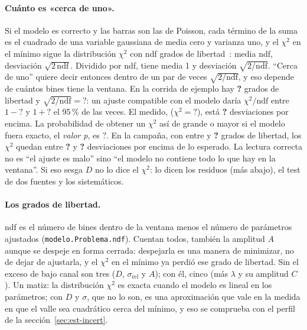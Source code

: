 \documentclass[11pt,a4paper]{article}
\newcommand{\faltaMacro}{\textbf{?}}
\providecommand{\EjNdf}{\faltaMacro}\providecommand{\EjChiDos}{\faltaMacro}
\providecommand{\EjSigmaNdf}{\faltaMacro}\providecommand{\EjDosSigmaNdf}{\faltaMacro}
\providecommand{\EjChiSigmas}{\faltaMacro}\providecommand{\EjChiPvalor}{\faltaMacro}
\providecommand{\NdfMax}{\faltaMacro}\providecommand{\ChiSigmasMin}{\faltaMacro}
\providecommand{\ChiSigmasMax}{\faltaMacro}
\begin{document}
\paragraph{Cuánto es «cerca de uno».} Si el modelo es correcto y las barras
son las de Poisson, cada término de la suma es el cuadrado de una variable
gaussiana de media cero y varianza uno, y el $\chi^2$ en el mínimo sigue la
distribución $\chi^2$ con ndf grados de libertad~\cite{cowan1998}: media
ndf, desviación $\sqrt{2\,\text{ndf}}$. Dividido por ndf, tiene media 1 y
desviación $\sqrt{2/\text{ndf}}$. ``Cerca de uno'' quiere decir entonces
dentro de un par de veces $\sqrt{2/\text{ndf}}$, y eso depende de cuántos
bines tiene la ventana. En la corrida de ejemplo hay \EjNdf{} grados de
libertad y $\sqrt{2/\text{ndf}} = \EjSigmaNdf$: un ajuste compatible con el
modelo daría $\chi^2/\text{ndf}$ entre $1 - \EjDosSigmaNdf$ y
$1 + \EjDosSigmaNdf$ el 95\,\% de las veces. El medido, \EjChiNdf{}
($\chi^2 = \EjChiDos$), está \EjChiSigmas{} desviaciones por encima. La
probabilidad de obtener un $\chi^2$ así de grande o mayor si el modelo fuera
exacto, el \emph{valor p}, es $\EjChiPvalor$. En la campaña, con entre
\NdfMin{} y \NdfMax{} grados de libertad, los $\chi^2$ quedan entre
\ChiSigmasMin{} y \ChiSigmasMax{} desviaciones por encima de lo esperado.
La lectura correcta no es ``el ajuste es malo'' sino ``el modelo no contiene
todo lo que hay en la ventana''. Si eso sesga $D$ no lo dice el $\chi^2$: lo
dicen los residuos (más abajo), el test de dos fuentes y los sistemáticos.

\paragraph{Los grados de libertad.} ndf es el número de bines dentro de la
ventana menos el número de parámetros ajustados
(\texttt{modelo.Problema.ndf}). Cuentan todos, también la amplitud $A$ aunque
se despeje en forma cerrada: despejarla es una manera de minimizar, no de
dejar de ajustarla, y el $\chi^2$ en el mínimo ya perdió ese grado de
libertad. Sin el exceso de bajo canal son tres ($D$, $\sigma_{\text{rel}}$ y
$A$); con él, cinco (más $\lambda$ y su amplitud $C$). Un matiz: la
distribución $\chi^2$ es exacta cuando el modelo es lineal en los parámetros;
con $D$ y $\sigma$, que no lo son, es una aproximación que vale en la medida
en que el valle sea cuadrático cerca del mínimo, y eso se comprueba con el
perfil de la sección~\ref{sec:est-incert}.
\end{document}
